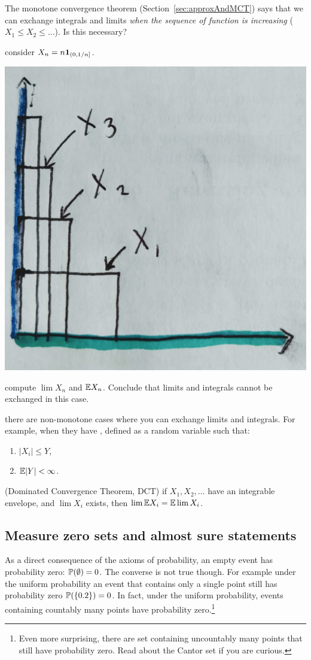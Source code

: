 \documentclass{article}
\begin{document}
The monotone convergence theorem (Section~\ref{sec:approxAndMCT}) says that we can exchange integrals and limits \emph{when the sequence of function is increasing} ($X_1 \le X_2 \le \dots$). Is this necessary?

 consider $X_n = n \1_{(0, 1/n]}$. 
\begin{center}
	\includegraphics[width=0.4\linewidth]{figures/limit-exchange-warn}
\end{center}

 compute $\lim X_n$ and $\E X_n$. Conclude that limits and integrals cannot be exchanged in this case.

 there are non-monotone cases where you can exchange limits and integrals. For example, when they have , defined as a random variable such that:
\begin{enumerate}
  \item $|X_i| \le Y$,
  \item $\E|Y| < \infty$.
\end{enumerate}

 (Dominated Convergence Theorem, DCT) if $X_1, X_2, \dots$ have an integrable envelope, and $\lim X_i$ exists, then $\lim \E X_i = \E \lim X_i$.


\subsection{Measure zero sets and almost sure statements}

As a direct consequence of the axioms of probability, an empty event has probability zero: $\P(\emptyset) = 0$. The converse is not true though. For example under the uniform probability an event that contains only a single point still has probability zero $\P(\{0.2\}) = 0$. In fact, under the uniform probability, events containing countably many points have probability zero.\footnote{Even more surprising, there are set containing uncountably many points that still have probability zero. Read about the Cantor set if you are curious.} 
\end{document}
